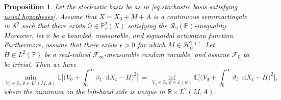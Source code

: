 \documentclass[11pt,a4paper,twoside,openany]{report}
\numberwithin{equation}{section}
\newcommand{\diff}{\mathop{}\!\mathrm{d}}
\theoremstyle{plain} %
\newtheorem{proposition}[theorem]{Proposition}
\theoremstyle{definition} %
\theoremstyle{remark} %
\begin{document}
\begin{proposition}\label{prop:continuous time deep mean--variance hedging for semimartingales under compactness}
    Let the stochastic basis be as in \eqref{eq:stochastic basis satisfying usual hypotheses}.
    Assume that \(X=X_0+M+A\) is a continuous semimartingale in \(\mathcal{S}^2\) such that there exists \(\mathbb{Q}\in\mathbb{P}_e^2(X)\) satisfying the \(\mathcal{R}_2(\mathbb{P})\)-inequality. Moreover, let \(\psi\) be a bounded, measurable, and sigmoidal activation function. Furthermore, assume that there exists \(\epsilon>0\) for which \(M\in\mathcal{H}_0^{2+\epsilon}\). Let \(H\in  L^2(\mathbb{P})\) be a real-valued \(\mathcal{F}_{\infty}\)-measurable random variable, and assume \(\mathcal{F}_0\) to be trivial. Then we have
\begin{equation}\label{eq:min equals inf semimartingale mean--variance hedging with epsilon integrability}
    \min_{V_0\in\mathbb{R},\,\vartheta\in L^2(M,A)}\mathbb{E}\bigg[\bigg(V_0+\int_{0}^{\infty}\vartheta_t\diff X_t-H\bigg)^2\bigg]
    \,=\,\inf_{V_0\in\mathbb{R},\,\vartheta\in \mathcal{E}(\psi)}
    \mathbb{E}\bigg[\bigg(V_0+\int_{0}^{\infty}\vartheta_t\diff X_t-H\bigg)^2\bigg],
\end{equation}
where the minimum on the left-hand side is unique in \(\mathbb{R}\times L^2(M,A).\)
\end{proposition}
\end{document}
